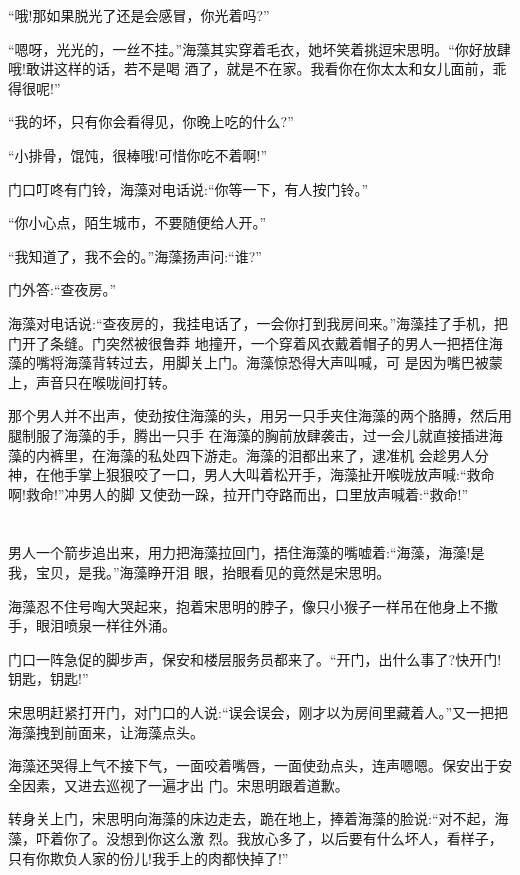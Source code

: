 \documentclass[11pt,a4paper,onecolumn]{article}
\begin{document}
``哦!那如果脱光了还是会感冒，你光着吗?''

``嗯呀，光光的，一丝不挂。''海藻其实穿着毛衣，她坏笑着挑逗宋思明。``你好放肆哦!敢讲这样的话，若不是喝
酒了，就是不在家。我看你在你太太和女儿面前，乖得很呢!''

``我的坏，只有你会看得见，你晚上吃的什么?''

``小排骨，馄饨，很棒哦!可惜你吃不着啊!''

门口叮咚有门铃，海藻对电话说:``你等一下，有人按门铃。''

``你小心点，陌生城市，不要随便给人开。''

``我知道了，我不会的。''海藻扬声问:``谁?''

门外答:``查夜房。''

海藻对电话说:``查夜房的，我挂电话了，一会你打到我房间来。''海藻挂了手机，把门开了条缝。门突然被很鲁莽
地撞开，一个穿着风衣戴着帽子的男人一把捂住海藻的嘴将海藻背转过去，用脚关上门。海藻惊恐得大声叫喊，可
是因为嘴巴被蒙上，声音只在喉咙间打转。

那个男人并不出声，使劲按住海藻的头，用另一只手夹住海藻的两个胳膊，然后用腿制服了海藻的手，腾出一只手
在海藻的胸前放肆袭击，过一会儿就直接插进海藻的内裤里，在海藻的私处四下游走。海藻的泪都出来了，逮准机
会趁男人分神，在他手掌上狠狠咬了一口，男人大叫着松开手，海藻扯开喉咙放声喊:``救命啊!救命!''冲男人的脚
又使劲一跺，拉开门夺路而出，口里放声喊着:``救命!''

\section[\thesection]{}

男人一个箭步追出来，用力把海藻拉回门，捂住海藻的嘴嘘着:``海藻，海藻!是我，宝贝，是我。''海藻睁开泪
眼，抬眼看见的竟然是宋思明。

海藻忍不住号啕大哭起来，抱着宋思明的脖子，像只小猴子一样吊在他身上不撒手，眼泪喷泉一样往外涌。

门口一阵急促的脚步声，保安和楼层服务员都来了。``开门，出什么事了?快开门!钥匙，钥匙!''

宋思明赶紧打开门，对门口的人说:``误会误会，刚才以为房间里藏着人。''又一把把海藻拽到前面来，让海藻点头。

海藻还哭得上气不接下气，一面咬着嘴唇，一面使劲点头，连声嗯嗯。保安出于安全因素，又进去巡视了一遍才出
门。宋思明跟着道歉。

转身关上门，宋思明向海藻的床边走去，跪在地上，捧着海藻的脸说:``对不起，海藻，吓着你了。没想到你这么激
烈。我放心多了，以后要有什么坏人，看样子，只有你欺负人家的份儿!我手上的肉都快掉了!''
\end{document}
